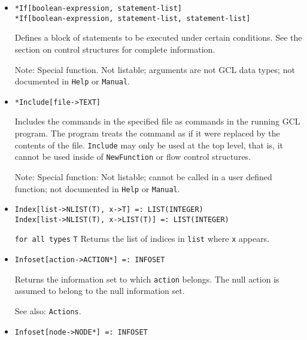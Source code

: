 \begin{itemize}

\item{} 
\protect \large \begin{verbatim}
*If[boolean-expression, statement-list]
*If[boolean-expression, statement-list, statement-list]
\end{verbatim} \normalsize
  
\bd
Defines a block of statements to be executed under certain conditions.
See the section on control structures for complete information. 
\item [Note:] Special function.  Not listable; arguments are not GCL
data types; not documented in \verb+Help+ or \verb+Manual+.  
\ed


\item{}
\protect \large \begin{verbatim}
*Include[file->TEXT]
\end{verbatim}\normalsize

\bd
Includes the commands in the specified file as commands
in the running GCL program.  The program treats the command as if it
were replaced by the contents of the file.  \verb+Include+ may only be used
at the top level, that is, it cannot be used inside of \verb+NewFunction+
or flow control structures.
\item [Note:] Special function:  Not listable; cannot be called in a
user defined function; not documented in \verb+Help+ or \verb+Manual+. 
\ed


\item{}
\protect \large \begin{verbatim}
Index[list->NLIST(T), x->T] =: LIST(INTEGER) 
Index[list->NLIST(T), x->LIST(T)] =: LIST(INTEGER) 
\end{verbatim} \normalsize

{\tt for all types} {\tt T}
\bd
Returns the list of indices in \verb+list+ where \verb+x+ appears.
\ed

\item{}
\protect \large \begin{verbatim}
Infoset[action->ACTION*] =: INFOSET 
\end{verbatim} \normalsize

\bd
Returns the information set to which \verb+action+ belongs.  The null
action is assumed to belong to the null information set.
\item [See also:] \verb+Actions+.
\ed

\item{}
\protect \large \begin{verbatim}
Infoset[node->NODE*] =: INFOSET 
\end{verbatim}\normalsize


\end{itemize}
